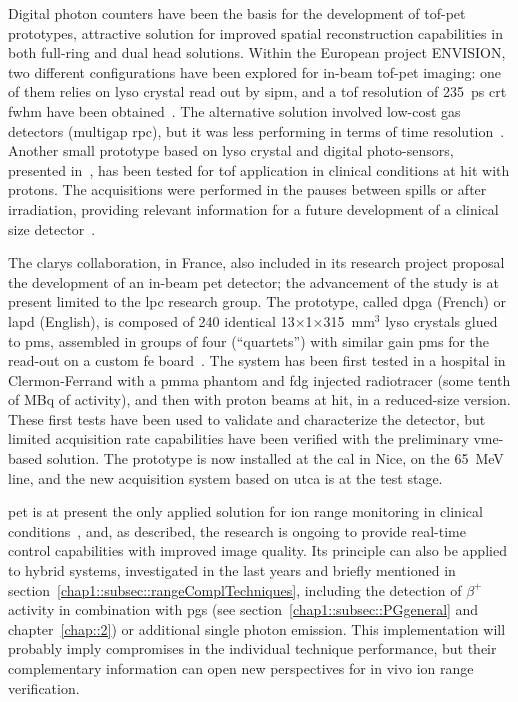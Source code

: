 Digital photon counters have been the basis for the development of \gls{tof}-\gls{pet} prototypes, attractive solution for improved spatial reconstruction capabilities in both full-ring and dual head solutions. Within the European project ENVISION, two different configurations have been explored for in-beam \gls{tof}-\gls{pet} imaging: one of them relies on \gls{lyso} crystal read out by \gls{sipm}, and a \gls{tof} resolution of 235~ps \gls{crt} \gls{fwhm} have been obtained~\parencite{Morrocchi2012}. The alternative solution involved low-cost gas detectors (multigap \gls{rpc}), but it was less performing in terms of time resolution~\parencite{Watts2013}. Another small prototype based on \gls{lyso} crystal and digital photo-sensors, presented in~\parencite{Degenhardt2012}, has been tested for \gls{tof} application in clinical conditions at \gls{hit} with protons. The acquisitions were performed in the pauses between spills or after irradiation, providing relevant information for a future development of a clinical size detector~\parencite{CambraiaLopes2016}.    

The \gls{clarys} collaboration, in France, also included in its research project proposal the development of an in-beam \gls{pet} detector; the advancement of the study is at present limited to the \gls{lpc} research group. The prototype, called \gls{dpga} (French) or \gls{lapd} (English), is composed of 240 identical 13$\times$1$\times$315~mm$^3$ \gls{lyso} crystals glued to \glspl{pm}, assembled in groups of four (\enquote{quartets}) with similar gain \glspl{pm} for the read-out on a custom \gls{fe} board~\parencite{Montarou2016}. The system has been first tested in a hospital in Clermon-Ferrand with a \gls{pmma} phantom and \gls{fdg} injected radiotracer (some tenth of MBq of activity), and then with proton beams at \gls{hit}, in a reduced-size version. These first tests have been used to validate and characterize the detector, but limited acquisition rate capabilities have been verified with the preliminary \gls{vme}-based solution. The prototype is now installed at the \gls{cal} in Nice, on the 65~MeV line, and the new acquisition system based on \gls{utca} is at the test stage.  

\gls{pet} is at present the only applied solution for ion range monitoring in clinical conditions~\parencite{Enghardt2004}, and, as described, the research is ongoing to provide real-time control capabilities with improved image quality. Its principle can also be applied to hybrid systems, investigated in the last years and briefly mentioned in section~\ref{chap1::subsec::rangeComplTechniques}, including the detection of $\beta^+$ activity in combination with \glspl{pg} (see section~\ref{chap1::subsec::PGgeneral} and chapter~\ref{chap::2}) or additional single photon emission. This implementation will probably imply compromises in the individual technique performance, but their complementary information can open new perspectives for in vivo ion range verification.  

